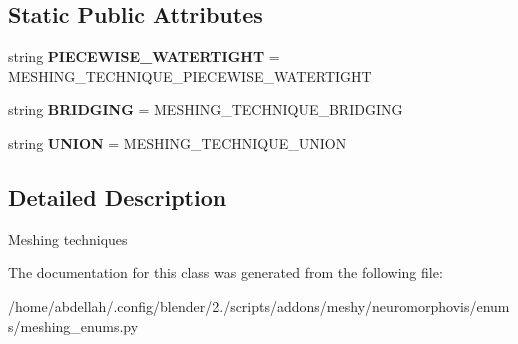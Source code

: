 \subsection*{Static Public Attributes}
\begin{DoxyCompactItemize}
\item 
string {\bfseries P\+I\+E\+C\+E\+W\+I\+S\+E\+\_\+\+W\+A\+T\+E\+R\+T\+I\+G\+HT} = \textquotesingle{}M\+E\+S\+H\+I\+N\+G\+\_\+\+T\+E\+C\+H\+N\+I\+Q\+U\+E\+\_\+\+P\+I\+E\+C\+E\+W\+I\+S\+E\+\_\+\+W\+A\+T\+E\+R\+T\+I\+G\+HT\textquotesingle{}\hypertarget{classmeshy_1_1neuromorphovis_1_1enums_1_1meshing__enums_1_1Meshing_1_1Technique_a8b913a47d767bdb811e61d3b4616234b}{}\label{classmeshy_1_1neuromorphovis_1_1enums_1_1meshing__enums_1_1Meshing_1_1Technique_a8b913a47d767bdb811e61d3b4616234b}

\item 
string {\bfseries B\+R\+I\+D\+G\+I\+NG} = \textquotesingle{}M\+E\+S\+H\+I\+N\+G\+\_\+\+T\+E\+C\+H\+N\+I\+Q\+U\+E\+\_\+\+B\+R\+I\+D\+G\+I\+NG\textquotesingle{}\hypertarget{classmeshy_1_1neuromorphovis_1_1enums_1_1meshing__enums_1_1Meshing_1_1Technique_a996677095365f6fc8f5c8625cd5f7f56}{}\label{classmeshy_1_1neuromorphovis_1_1enums_1_1meshing__enums_1_1Meshing_1_1Technique_a996677095365f6fc8f5c8625cd5f7f56}

\item 
string {\bfseries U\+N\+I\+ON} = \textquotesingle{}M\+E\+S\+H\+I\+N\+G\+\_\+\+T\+E\+C\+H\+N\+I\+Q\+U\+E\+\_\+\+U\+N\+I\+ON\textquotesingle{}\hypertarget{classmeshy_1_1neuromorphovis_1_1enums_1_1meshing__enums_1_1Meshing_1_1Technique_a1e3094bd4b3829c8abf88df80b59211c}{}\label{classmeshy_1_1neuromorphovis_1_1enums_1_1meshing__enums_1_1Meshing_1_1Technique_a1e3094bd4b3829c8abf88df80b59211c}

\end{DoxyCompactItemize}


\subsection{Detailed Description}


\begin{DoxyVerb}Meshing techniques
\end{DoxyVerb}
 

The documentation for this class was generated from the following file\+:\begin{DoxyCompactItemize}
\item 
/home/abdellah/.\+config/blender/2./scripts/addons/meshy/neuromorphovis/enums/meshing\+\_\+enums.\+py\end{DoxyCompactItemize}
